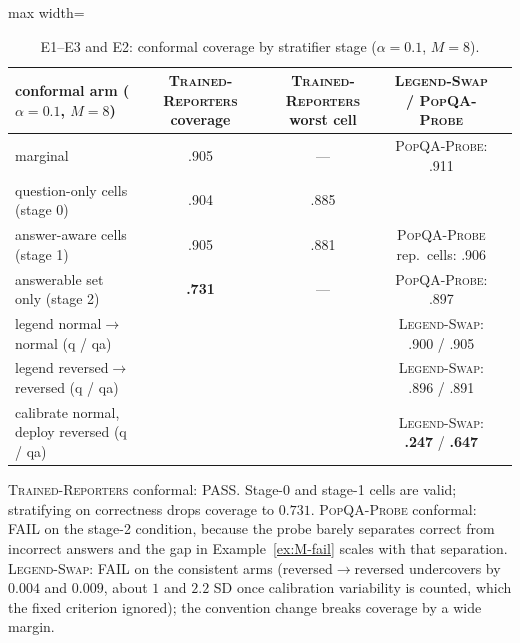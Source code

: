 \documentclass[twoside]{article}
\theoremstyle{definition}
\theoremstyle{remark}
\newcommand{\1}{\mathbf{1}}
\newcommand{\expname}[1]{\textsc{#1}}
\begin{document}
\begin{table}[t]
\caption{E1--E3 and E2: conformal coverage by stratifier stage ($\alpha=0.1$, $M=8$).}
\centering\small
\begin{adjustbox}{max width=\textwidth}
\begin{tabular}{lcccc}
\toprule
conformal arm ($\alpha=0.1$, $M=8$) & \expname{Trained-Reporters} coverage & \expname{Trained-Reporters} worst cell & \expname{Legend-Swap} / \expname{PopQA-Probe} & \\
\midrule
marginal & .905 & --- & \expname{PopQA-Probe}: .911 & \\
question-only cells (stage 0) & .904 & .885 & & \\
answer-aware cells (stage 1) & .905 & .881 & \expname{PopQA-Probe} rep.\ cells: .906 & \\
answerable set only (stage 2) & \textbf{.731} & --- & \expname{PopQA-Probe}: .897 & \\
legend normal$\to$normal (q / qa) & & & \expname{Legend-Swap}: .900 / .905 & \\
legend reversed$\to$reversed (q / qa) & & & \expname{Legend-Swap}: .896 / .891 & \\
calibrate normal, deploy reversed (q / qa) & & & \expname{Legend-Swap}: \textbf{.247} / \textbf{.647} & \\
\bottomrule
\end{tabular}
\end{adjustbox}
\end{table}
\expname{Trained-Reporters} conformal: PASS. Stage-0 and stage-1 cells are valid; stratifying on correctness drops coverage
to $0.731$. \expname{PopQA-Probe} conformal: FAIL on the stage-2 condition, because the probe barely separates correct
from incorrect answers and the gap in Example~\ref{ex:M-fail} scales with that separation.
\expname{Legend-Swap}: FAIL on the consistent arms (reversed$\to$reversed undercovers by $0.004$ and $0.009$, about
$1$ and $2.2$ SD once calibration variability is counted, which the fixed criterion ignored); the
convention change breaks coverage by a wide margin.
\end{document}
